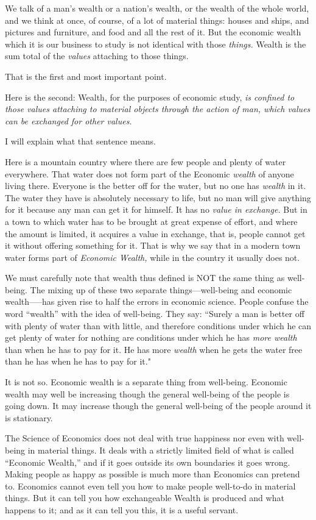 \documentclass{book}
\begin{document}
We talk of a man’s wealth or a nation’s wealth, or the wealth of the whole world, and we think at once, of course, of a lot of material things: houses and ships, and pictures and furniture, and food and all the rest of it. But the economic wealth which it is our business to study is not identical with those \emph{things.} Wealth is the sum total of the \emph{values} attaching to those things.

That is the first and most important point.

Here is the second: Wealth, for the purposes of economic study, \emph{is confined to those values attaching to material objects through the action of man, which values can be exchanged for other values.}

I will explain what that sentence means.

Here is a mountain country where there are few people and plenty of water everywhere. That water does not form part of the Economic \emph{wealth} of anyone living there. Everyone is the better off for the water, but no one has \emph{wealth} in it. The water they have is absolutely necessary to life, but no man will give anything for it because any man can get it for himself. It has no \emph{value in exchange.} But in a town to which water has to be brought at great expense of effort, and where the amount is limited, it acquires a value in exchange, that is, people cannot get it without offering something for it. That is why we say that in a modern town water forms part of \emph{Economic Wealth,} while in the country it usually does not.

We must carefully note that wealth thus defined is NOT the same thing as well-being. The mixing up of these two separate things—well-being and economic wealth–—has given rise to half the errors in economic science. People confuse the word “wealth” with the idea of well-being. They say: “Surely a man is better off with plenty of water than with little, and therefore conditions under which he can get plenty of water for nothing are conditions under which he has \emph{more wealth} than when he has to pay for it. He has more \emph{wealth} when he gets the water free than he has when he has to pay for it."

It is not so. Economic wealth is a separate thing from well-being. Economic wealth may well be increasing though the general well-being of the people is going down. It may increase though the general well-being of the people around it is stationary.

The Science of Economics does not deal with true happiness nor even with well-being in material things. It deals with a strictly limited field of what is called “Economic Wealth,” and if it goes outside its own boundaries it goes wrong. Making people as happy as possible is much more than Economics can pretend to. Economics cannot even tell you how to make people well-to-do in material things. But it can tell you how exchangeable Wealth is produced and what happens to it; and as it can tell you this, it is a useful servant.
\end{document}
